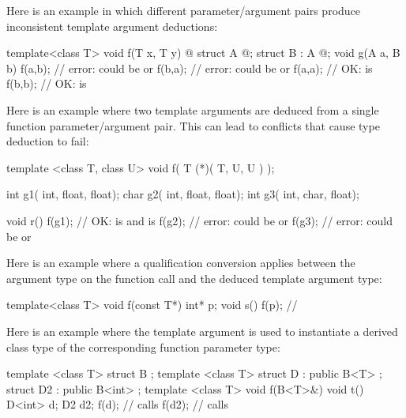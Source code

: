 \pnum
\begin{example}
Here is an example in which different parameter/argument pairs produce
inconsistent template argument deductions:

\begin{codeblock}
template<class T> void f(T x, T y) { @\commentellip@ }
struct A { @\commentellip@ };
struct B : A { @\commentellip@ };
void g(A a, B b) {
  f(a,b);           // error:  could be  or 
  f(b,a);           // error:  could be  or 
  f(a,a);           // OK:  is 
  f(b,b);           // OK:  is 
}
\end{codeblock}

Here is an example where two template arguments are deduced from a
single function parameter/argument pair.
This can lead to conflicts
that cause type deduction to fail:

\begin{codeblock}
template <class T, class U> void f(  T (*)( T, U, U )  );

int g1( int, float, float);
char g2( int, float, float);
int g3( int, char, float);

void r() {
  f(g1);            // OK:  is  and  is 
  f(g2);            // error:  could be  or 
  f(g3);            // error:  could be  or 
}
\end{codeblock}

Here is an example where a qualification conversion applies between the
argument type on the function call and the deduced template argument type:

\begin{codeblock}
template<class T> void f(const T*) { }
int* p;
void s() {
  f(p);             // 
}
\end{codeblock}

Here is an example where the template argument is used to instantiate
a derived class type of the corresponding function parameter type:

\begin{codeblock}
template <class T> struct B { };
template <class T> struct D : public B<T> {};
struct D2 : public B<int> {};
template <class T> void f(B<T>&){}
void t() {
  D<int> d;
  D2     d2;
  f(d);             // calls 
  f(d2);            // calls 
}
\end{codeblock}
\end{example}

